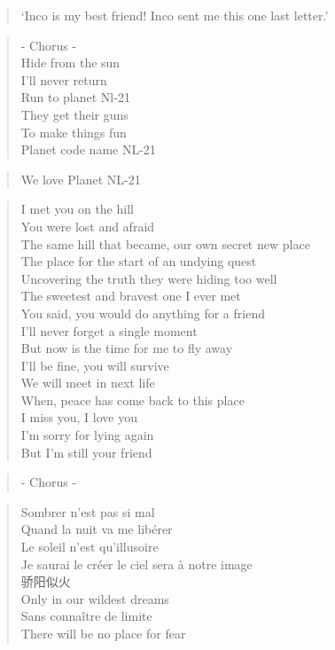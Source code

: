 
\begin{verse}
`Inco is my best friend! Inco sent me this one last letter.'
\end{verse}

\begin{verse}
- Chorus - \\
Hide from the sun \\
I'll never return \\
Run to planet Nl-21 \\
They get their guns \\
To make things fun \\
Planet code name NL-21
\end{verse}

\begin{verse}
We love Planet NL-21
\end{verse}

\begin{verse}
I met you on the hill \\
You were lost and afraid \\
The same hill that became, our own secret new place \\
The place for the start of an undying quest \\
Uncovering the truth they were hiding too well \\
The sweetest and bravest one I ever met \\
You said, you would do anything for a friend \\
I'll never forget a single moment \\
But now is the time for me to fly away \\
I'll be fine, you will survive \\
We will meet in next life \\
When, peace has come back to this place \\
I miss you, I love you \\
I'm sorry for lying again \\
But I'm still your friend
\end{verse}

\clearpage
{}

\begin{verse}
- Chorus -
\end{verse}

\begin{verse}
Sombrer n'est pas si mal  \\
Quand la nuit va me libérer \\
Le soleil n'est qu'illusoire \\
Je saurai le créer le ciel sera à notre image \\
骄阳似火 \\ 
Only in our wildest dreams \\
Sans connaître de limite \\
There will be no place for fear
\end{verse}

